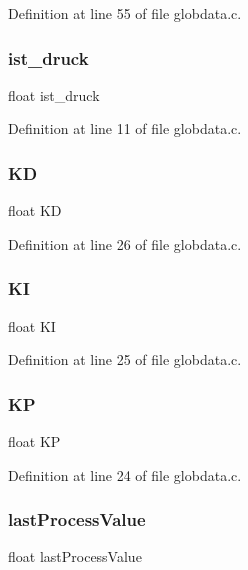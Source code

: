Definition at line 55 of file globdata.\+c.

\mbox{\label{globdata_8c_a3e6af77067a051a638e36c1bb1c4400e}} 
\subsubsection{ist\+\_\+druck}
{\footnotesize\ttfamily float ist\+\_\+druck}



Definition at line 11 of file globdata.\+c.

\mbox{\label{globdata_8c_a16424cc4cde718119fedda0db72c792f}} 
\subsubsection{KD}
{\footnotesize\ttfamily float KD}



Definition at line 26 of file globdata.\+c.

\mbox{\label{globdata_8c_aa7d5dd64817c03d067d0e922cd35d75c}} 
\subsubsection{KI}
{\footnotesize\ttfamily float KI}



Definition at line 25 of file globdata.\+c.

\mbox{\label{globdata_8c_abf14c0656fbb57a86c322a87af806030}} 
\subsubsection{KP}
{\footnotesize\ttfamily float KP}



Definition at line 24 of file globdata.\+c.

\mbox{\label{globdata_8c_aaec2b817d9d42d306ebdc33e863a1674}} 
\subsubsection{last\+Process\+Value}
{\footnotesize\ttfamily float last\+Process\+Value}



